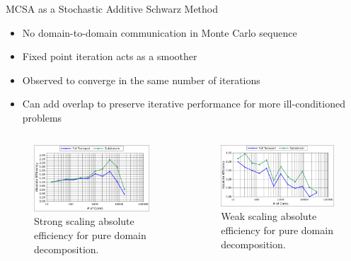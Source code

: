 \documentclass{beamer}
\begin{document}
\begin{frame}{MCSA as a Stochastic Additive Schwarz Method}

  \begin{itemize}
  \item No domain-to-domain communication in Monte Carlo sequence
    \smallskip
  \item Fixed point iteration acts as a smoother
    \smallskip
  \item Observed to converge in the same number of iterations
    \smallskip
  \item Can add overlap to preserve iterative performance for more
    ill-conditioned problems
  \end{itemize}

  \begin{columns}
    \begin{column}{0.5\textwidth}

      \begin{figure}[t!]
        \begin{center}
          \includegraphics[width=2.35in]{titan_strong_subdomain.pdf}
        \end{center}
        \caption{Strong scaling absolute efficiency for pure domain
          decomposition.}
        \label{fig:titan_strong_subdomain}
      \end{figure}

    \end{column}

    \begin{column}{0.5\textwidth}

      \begin{figure}[t!]
        \begin{center}
          \includegraphics[width=2.35in]{titan_weak_subdomain.pdf}
        \end{center}
        \caption{Weak scaling absolute efficiency for pure domain
          decomposition.}
        \label{fig:titan_weak_subdomain}
      \end{figure}

    \end{column}
  \end{columns}

\end{frame}
\end{document}
